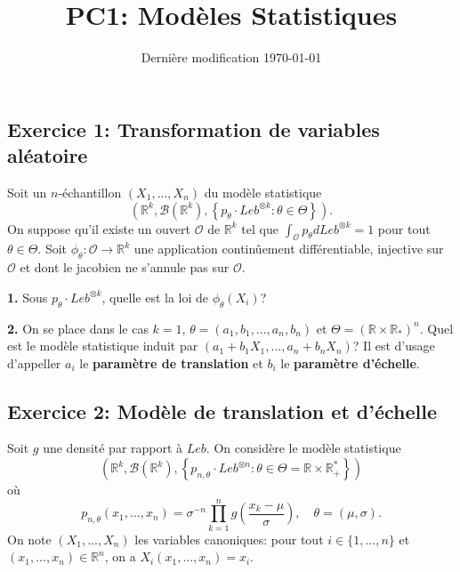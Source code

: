 \documentclass[french]{article}
\begin{document}
	\title{PC1: Modèles Statistiques}
	\date{Dernière modification \today}
	
	\maketitle
	
	\subsection*{Exercice 1: Transformation de variables aléatoire}
	
	\begin{tcolorbox}[colback=yellow!5!white,colframe=yellow!75!black]
		Soit un $n$-échantillon $(X_1, ..., X_n)$ du modèle statistique
		\[\left( \mathbb{R}^k, \mathcal{B}(\mathbb{R}^k), \left\{p_\theta \cdot Leb^{\otimes k} : \theta \in \Theta \right\} \right).\]
		On suppose qu'il existe un ouvert $\mathcal{O}$ de $\mathbb{R}^k$ tel que $\int_{\mathcal{O}} p_\theta dLeb^{\otimes k} = 1$ pour tout $\theta \in \Theta$.
		Soit $\phi_\theta: \mathcal{O} \to \mathbb{R}^k$ une application continûement différentiable, injective sur $\mathcal{O}$ et dont le jacobien ne s'annule pas sur $\mathcal{O}$.
	\end{tcolorbox}
	
	\begin{tcolorbox}[colback=gray!5!white,colframe=gray!75!black]
	\textbf{1.} Sous $p_\theta \cdot Leb^{\otimes k}$, quelle est la loi de $\phi_\theta(X_i)$?
	\end{tcolorbox}
	
	
	\begin{tcolorbox}[colback=gray!5!white,colframe=gray!75!black]
		\textbf{2.} On se place dans le cas $k=1$, $\theta = (a_1, b_1, ..., a_n, b_n)$ et $\Theta = (\mathbb{R} \times \mathbb{R}_*)^n$. Quel est le modèle statistique induit par $(a_1 + b_1X_1, ..., a_n + b_nX_n)$? Il est d'usage d'appeller $a_i$ le \textbf{paramètre de translation} et $b_i$ le \textbf{paramètre d'échelle}.
	\end{tcolorbox}

	\subsection*{Exercice 2: Modèle de translation et d'échelle}

	\begin{tcolorbox}[colback=yellow!5!white,colframe=yellow!75!black]
		Soit $g$ une densité par rapport à $Leb$. On considère le modèle statistique
		\[\left(\mathbb{R}^k, \mathcal{B}(\mathbb{R}^k), \left\{p_{n,\theta} \cdot Leb^{\otimes n} : \theta \in \Theta = \mathbb{R} \times \mathbb{R}_+^*\right\}\right)\]
		où
		\[p_{n, \theta}(x_1,...,x_n) = \sigma^{-n} \prod_{k=1}^{n} g\left(\frac{x_k - \mu}{\sigma}\right), \quad \theta = (\mu, \sigma).\]
		On note $(X_1, ..., X_n)$ les variables canoniques: pour tout $i \in \{1,...,n\}$ et $(x_1,...,x_n) \in \mathbb{R}^n$, on a $X_i(x_1,...,x_n) = x_i$.
	\end{tcolorbox}
	
\end{document}
